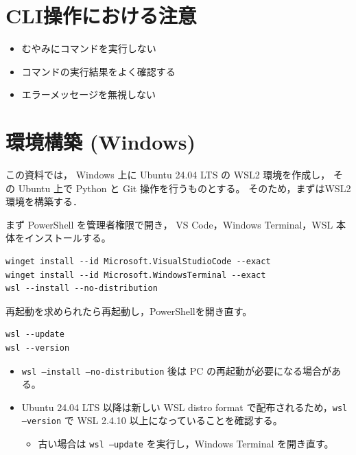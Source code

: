 \section{CLI操作における注意}

\begin{itemize}
\item むやみにコマンドを実行しない

\item コマンドの実行結果をよく確認する

\item エラーメッセージを無視しない

\end{itemize}

\section{環境構築 (Windows)}

この資料では，
Windows 上に Ubuntu 24.04 LTS の WSL2 環境を作成し，
その Ubuntu 上で Python と Git 操作を行うものとする。
そのため，まずはWSL2環境を構築する．

まず PowerShell を管理者権限で開き，
VS Code，Windows Terminal，WSL 本体をインストールする。

\begin{lstlisting}[style=codecell]
winget install --id Microsoft.VisualStudioCode --exact
winget install --id Microsoft.WindowsTerminal --exact
wsl --install --no-distribution
\end{lstlisting}

再起動を求められたら再起動し，PowerShellを開き直す。

\begin{lstlisting}[style=codecell]
wsl --update
wsl --version
\end{lstlisting}

\begin{itemize}
\item \texttt{wsl --install --no-distribution} 後は PC の再起動が必要になる場合がある。

\item Ubuntu 24.04 LTS 以降は新しい WSL distro format で配布されるため，\texttt{wsl --version} で WSL 2.4.10 以上になっていることを確認する。

\begin{itemize}
\item 古い場合は \texttt{wsl --update} を実行し，Windows Terminal を開き直す。

\end{itemize}

\end{itemize}

